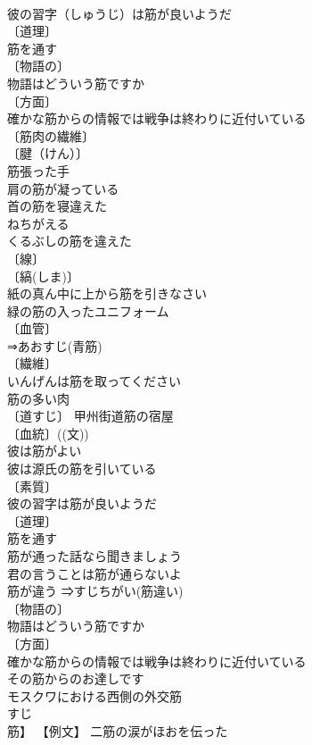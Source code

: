 \documentclass[8pt]{extreport}
\begin{document}
\begin{CJK}{UTF8}{min}
\\	彼の習字（しゅうじ）は筋が良いようだ 
\\	〔道理〕
\\	筋を通す 
\\	〔物語の〕
\\	物語はどういう筋ですか 
\\	〔方面〕
\\	確かな筋からの情報では戦争は終わりに近付いている 
\\	〔筋肉の繊維〕
\\	〔腱（けん）〕
\\	筋張った手 
\\	肩の筋が凝っている 
\\	首の筋を寝違えた 
\\	ねちがえる　
\\	くるぶしの筋を違えた 
\\	〔線〕
\\	〔縞(しま)〕
\\	紙の真ん中に上から筋を引きなさい 
\\	緑の筋の入ったユニフォーム 
\\	〔血管〕
\\	⇒あおすじ(青筋) 
\\	〔繊維〕
\\	いんげんは筋を取ってください 
\\	筋の多い肉 
\\	〔道すじ〕 甲州街道筋の宿屋 
\\	〔血統〕((文)) 
\\	彼は筋がよい 
\\	彼は源氏の筋を引いている 
\\	〔素質〕
\\	彼の習字は筋が良いようだ 
\\	〔道理〕
\\	筋を通す 
\\	筋が通った話なら聞きましょう 
\\	君の言うことは筋が通らないよ 
\\	筋が違う ⇒すじちがい(筋違い)
\\	〔物語の〕
\\	物語はどういう筋ですか 
\\	〔方面〕
\\	確かな筋からの情報では戦争は終わりに近付いている 
\\	その筋からのお達しです 
\\	モスクワにおける西側の外交筋 
\\	すじ
\\	筋】 【例文】 二筋の涙がほおを伝った 

\end{CJK}
\end{document}
